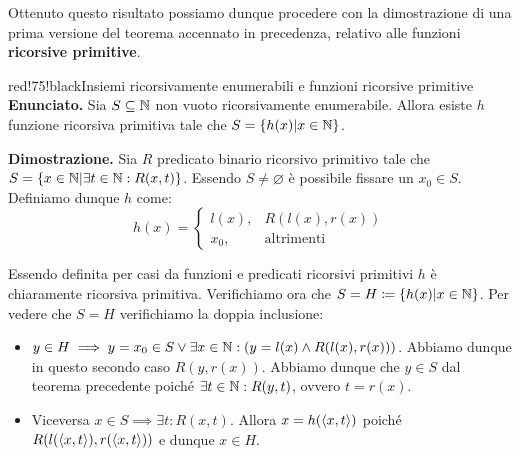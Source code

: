 Ottenuto questo risultato possiamo dunque procedere con la dimostrazione di una prima versione del teorema accennato in precedenza, relativo alle funzioni \textbf{ricorsive primitive}.
\begin{halfframedbox}{red!75!black}{Insiemi ricorsivamente enumerabili e funzioni ricorsive primitive}
  \textbf{Enunciato. } Sia \(S \subseteq \mathbb{N}\) non vuoto ricorsivamente enumerabile. Allora esiste \(h\) funzione ricorsiva primitiva tale che \(S=\displaystyle{\left\{{h(x) | x \in \mathbb{N}}\right\}}\).
  \begin{center}
    \textcolor{red!75!black}{\hdashrule[0.5ex]{18cm}{1pt}{3mm 3pt 1mm 2pt}}
  \end{center}
  \textbf{Dimostrazione. } Sia \(R\) predicato binario ricorsivo primitivo tale che \(S=\displaystyle{\left\{{ x \in \mathbb{N}\vert \exists t \in \mathbb{N}: R(x,t)}\right\}}\). Essendo \(S \neq \varnothing \) è possibile fissare un \(x_0 \in S\). Definiamo dunque \(h\) come:
  \begin{equation}
    h(x) = \begin{cases}
      l(x), & R(l(x),r(x))\\
      x_0, & \text{altrimenti}
    \end{cases}
  \end{equation}

  Essendo definita per casi da funzioni e predicati ricorsivi primitivi \(h\) è chiaramente ricorsiva primitiva. Verifichiamo ora che \(S= H \coloneq\displaystyle{\left\{{h(x) | x \in \mathbb{N}}\right\}}\).
  Per vedere che \(S=H\) verifichiamo la doppia inclusione:
  \begin{itemize}
    \item[\(\subseteq\)] \(y \in H \implies y=x_0 \in S \lor \exists x \in \mathbb{N}: \left(y=l(x) \land R(l(x),r(x))\right)\). Abbiamo dunque in questo secondo caso \(R(y,r(x))\). Abbiamo dunque che \(y\in S\) dal teorema precedente poiché \(\exists t \in \mathbb{N}: R(y,t)\), ovvero \(t=r(x)\).
    \item[\(\supseteq\)]  Viceversa \(x \in S \implies \exists t : R(x,t)\). Allora \(x=h(\displaystyle{\left\langle{ x,t }\right\rangle})\) poiché \(R(l(\displaystyle{\left\langle{ x,t }\right\rangle}),r(\displaystyle{\left\langle{ x,t }\right\rangle}))\) e dunque \(x \in H\).
  \end{itemize}
\end{halfframedbox}

\newpage

